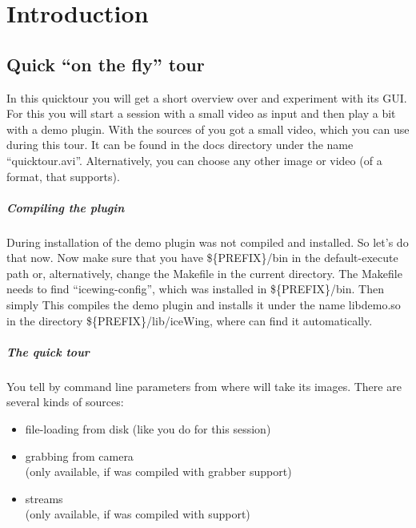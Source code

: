 
\newcommand{\quicktourFile}{quicktour.avi}

\chapter{Introduction}

\section{Quick ``on the fly'' tour}
\label{sec:quicktour}

In this quicktour you will get a short overview over \icewing{} and
experiment with its GUI. For this you will start a session with a
small video as input and then play a bit with a demo plugin.
With the sources of \icewing{} you got a small video, which you can
use during this tour. It can be found in the docs directory under
the name ``\quicktourFile{}''. Alternatively, you can choose any
other image or video (of a format, that \icewing{} supports).

\paragraph{Compiling the plugin}

During installation of \icewing{} the demo plugin was not compiled
and installed. So let's do that now.
\sS
{}
\sE
Now make sure that you have \$\{PREFIX\}/bin in the default-execute
path or, alternatively, change the Makefile in the current
directory. The Makefile needs to find ``icewing-config'', which was
installed in \$\{PREFIX\}/bin. Then simply
\sS
{}
\sE
This compiles the demo plugin and installs it under the name
libdemo.so in the directory \$\{PREFIX\}/lib/iceWing, where \icewing{}
can find it automatically.

\paragraph{The quick tour}

You tell by command line parameters from where \icewing{} will take
its images. There are several kinds of sources: 

\begin{itemize}
\item file-loading from disk (like you do for this session)
\item grabbing from camera\\
  (only available, if \icewing{} was compiled with grabber support)
\item \dacs{} streams\\
  (only available, if \icewing{} was compiled with \dacs{} support)
\end{itemize}

